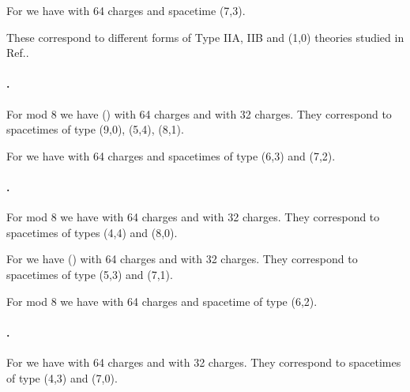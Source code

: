 \documentclass[a4paper,12pt]{article}
\begin{document}
\smallskip

\noindent For \coordHE{} we have \coordHE{} with 64 charges
and spacetime (7,3).

These correspond to different forms of Type IIA, IIB and (1,0)
theories studied in Ref.\cite{hu}.

\paragraph{\coordHE{}.} For \coordHE{} mod 8 we have \coordHE{}
(\coordHE{}) with 64 charges  and  \coordHE{} with 32 charges.
They correspond to   spacetimes of type (9,0), (5,4), (8,1).

\smallskip

\noindent For \coordHE{} we have \coordHE{} with 64
charges and spacetimes of type (6,3) and (7,2).


\paragraph{\coordHE{}.} For \coordHE{} mod 8 we have \coordHE{} with 64 charges
and  \coordHE{} with 32 charges. They correspond to  spacetimes
of types (4,4) and (8,0).

\smallskip

\noindent For \coordHE{} we have \coordHE{} (\coordHE{}) with
64 charges and \coordHE{} with 32 charges. They correspond to
 spacetimes of type (5,3) and (7,1).

\smallskip

\noindent For \coordHE{} mod 8 we have \coordHE{} with 64
charges and spacetime of type (6,2).

\paragraph{\coordHE{}.}For \coordHE{} we have \coordHE{} with 64
charges and \coordHE{} with 32 charges. They correspond to
spacetimes of type (4,3) and (7,0).
\end{document}

